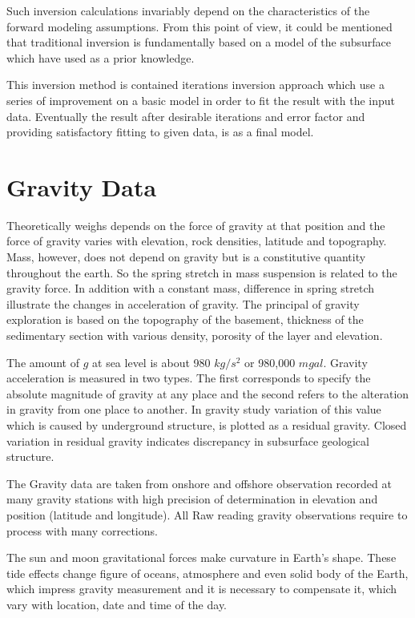 Such inversion calculations invariably depend on the characteristics of the forward modeling assumptions. From this point of view, it could be mentioned that traditional inversion is fundamentally based on a model of the subsurface which have used as a prior knowledge.

This inversion method is contained iterations inversion approach which use a series of improvement on a basic model in order to fit the result with the input data. Eventually the result after desirable iterations and error factor and providing satisfactory fitting to given data, is as a final model.


\section{Gravity Data}

Theoretically weighs depends on the force of gravity at that position and the force of gravity varies with elevation, rock densities, latitude and topography. Mass, however, does not depend on gravity but is a constitutive quantity throughout the earth. So the spring stretch in mass suspension is related to the gravity force. In addition with a constant mass, difference in spring stretch illustrate the changes in acceleration of gravity. The principal of gravity exploration is based on the topography of the basement, thickness of the sedimentary section with various density, porosity of the layer and elevation.

The amount of $g$ at sea level is about 980 $kg/s^2$ or 980,000 $mgal$. Gravity acceleration is measured in two types. The first corresponds to specify the absolute magnitude of gravity at any place and the second refers to the alteration in gravity from one place to another. In gravity study variation of this value which is caused by underground structure, is plotted as a residual gravity. Closed variation in residual gravity indicates discrepancy in subsurface geological structure.

The Gravity data are taken from onshore and offshore observation recorded at many gravity stations with high precision of determination in elevation and position (latitude and longitude). All Raw reading gravity observations require to process with many corrections.

The sun and moon gravitational forces make curvature in Earth's shape. These tide effects change figure of oceans, atmosphere and even solid body of the Earth, which impress gravity measurement and it is necessary to compensate it, which vary with location, date and time of the day.

